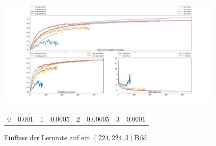 \documentclass[12pt,a4paper]{scrartcl}
\numberwithin{equation}{section}
\begin{document}
\begin{figure}[h]
	\includegraphics[width=\linewidth]{LearningRate}
	\begin{center}
		\begin{tabular}{r@{: }l r@{: }l r@{: }l r@{: }l}
			$0$ & $ 0.001 $ &$ 1$& $ 0.0005 $ &	$ 2 $ & $ 0.00005 $ &$3$ & $ 0.0001 $
		\end{tabular}
		
	\end{center}
	\caption{Einfluss der Lernrate auf ein $ (224,224,3) $Bild.}
	\label{fig:Lernrate}
\end{figure}
\end{document}
